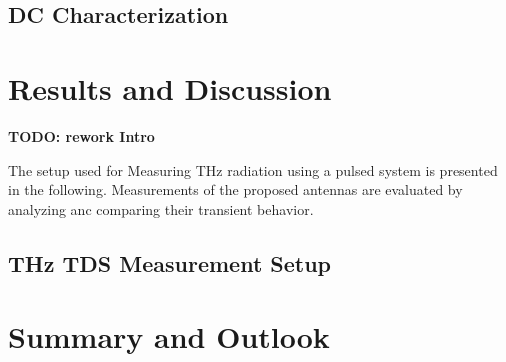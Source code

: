 \documentclass[
	german,%
	accentcolor=9c,%
	ruledheaders=section,%
	class=report,%
	thesis={type=bachelor},%
	fontsize=11pt,%
	parskip=half-,%
	custommargins=false,%
	marginpar=false,%
	BCOR=0mm,%
 	logofile=tools/logo-installation/TUDa-logos/tuda_logo.png,%
]{tudapub}
\begin{document}

\section{DC Characterization}


\chapter{Results and Discussion}

\textbf{TODO: rework Intro}

The setup used for Measuring THz radiation using a pulsed system is presented in the following. Measurements of the proposed antennas are evaluated by analyzing anc comparing their transient behavior. 

\section{THz TDS Measurement Setup}



\chapter{Summary and Outlook}

\printbibliography
\end{document}
